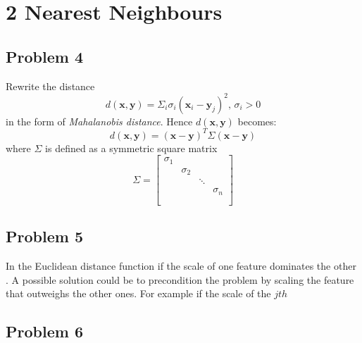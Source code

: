 \section*{2 Nearest Neighbours}

\subsection*{Problem 4}
Rewrite the distance
\[
    d(\mathbf{x}, \mathbf{y}) = 
    \Sigma_i \sigma_i (\mathbf{x}_i - \mathbf{y}_j)^2, \, \sigma_i > 0
\]
in the form of \textit{Mahalanobis distance}. Hence $d(\mathbf{x}, \mathbf{y})$
becomes:
\[
    d(\mathbf{x}, \mathbf{y}) = 
    (\mathbf{x} - \mathbf{y})^T \Sigma (\mathbf{x} - \mathbf{y}) 
\]
where $\Sigma$ is defined as a symmetric square matrix
\[
\Sigma =
\left[
    \begin{array}{ccccc}
        \sigma_1\\
        & \sigma_2\\
        &  & \ddots\\
        &  &  & \sigma_n\\
        \\
    \end{array}
\right]
\]

\subsection*{Problem 5} 
In the Euclidean distance function if the scale of one feature dominates the
other .
A possible solution could be to precondition the problem by scaling the feature
that outweighs the other ones. For example if the scale of the $jth$

\subsection*{Problem 6} 


